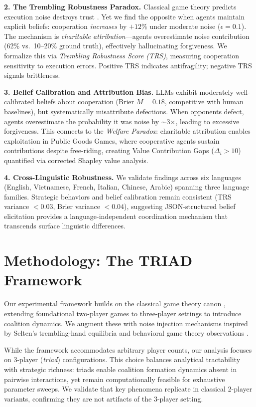 \documentclass{uai2026} %
\begin{document}
\textbf{2. The Trembling Robustness Paradox.} Classical game theory predicts execution noise destroys trust \citep{nowak1992tit}. Yet we find the opposite when agents maintain explicit beliefs: cooperation \textit{increases} by $+12\%$ under moderate noise ($\epsilon=0.1$). The mechanism is \textit{charitable attribution}---agents overestimate noise contribution (62\% vs.~10--20\% ground truth), effectively hallucinating forgiveness. We formalize this via \textit{Trembling Robustness Score (TRS)}, measuring cooperation sensitivity to execution errors. Positive TRS indicates antifragility; negative TRS signals brittleness.

\textbf{3. Belief Calibration and Attribution Bias.} LLMs exhibit moderately well-calibrated beliefs about cooperation (Brier $M=0.18$, competitive with human baselines), but systematically misattribute defections. When opponents defect, agents overestimate the probability it was noise by $\sim$3$\times$, leading to excessive forgiveness. This connects to the \textit{Welfare Paradox}: charitable attribution enables exploitation in Public Goods Games, where cooperative agents sustain contributions despite free-riding, creating Value Contribution Gaps ($\Delta_i > 10$) quantified via corrected Shapley value analysis.

\textbf{4. Cross-Linguistic Robustness.} We validate findings across six languages (English, Vietnamese, French, Italian, Chinese, Arabic) spanning three language families. Strategic behaviors and belief calibration remain consistent (TRS variance $< 0.03$, Brier variance $< 0.04$), suggesting JSON-structured belief elicitation provides a language-independent coordination mechanism that transcends surface linguistic differences.

\section{Methodology: The TRIAD Framework}\label{sec:method}

Our experimental framework builds on the classical game theory canon \citep{neumann1944theory,fudenberg1991game,myerson1991game}, extending foundational two-player games to three-player settings to introduce coalition dynamics. We augment these with noise injection mechanisms inspired by Selten's trembling-hand equilibria \citep{selten1975reexamination} and behavioral game theory observations \citep{camerer2003behavioral}.

While the framework accommodates arbitrary player counts, our analysis focuses on 3-player (\textit{triad}) configurations. This choice balances analytical tractability with strategic richness: triads enable coalition formation dynamics absent in pairwise interactions, yet remain computationally feasible for exhaustive parameter sweeps. We validate that key phenomena replicate in classical 2-player variants, confirming they are not artifacts of the 3-player setting.
\end{document}
